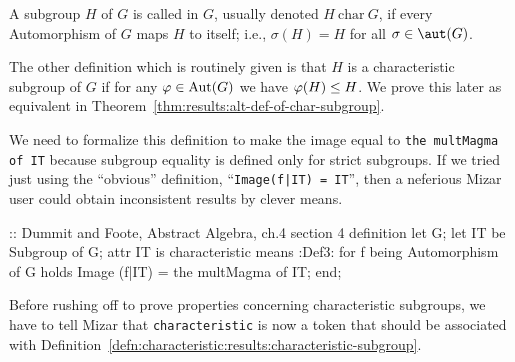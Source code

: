\begin{definition}\label{defn:characteristic:results:characteristic-subgroup}
A subgroup $H$ of $G$ is called  in $G$, usually
denoted $H~\mathrm{char}~G$, if every Automorphism of $G$ maps $H$ to
itself; i.e., $\sigma(H)=H$ for all $\sigma\in\aut(G)$.
\end{definition}

\begin{def-remark}
The other definition which is routinely given is that $H$ is a
characteristic subgroup of $G$ if for any $\varphi\in\operatorname{Aut}(G)$ we have
$\varphi(H)\leq H$. We prove this later as equivalent in Theorem~\ref{thm:results:alt-def-of-char-subgroup}.
\end{def-remark}
\begin{def-remark}
We need to formalize this definition to make the image equal to
\lstinline{the multMagma of IT} because subgroup equality is defined
only for strict subgroups. If we tried just using the ``obvious''
definition, ``\lstinline{Image(f|IT) = IT}'', then a neferious Mizar
user could obtain inconsistent results by clever means.
\end{def-remark}

\nwenddocs{}\endmoddef\nwstartdeflinemarkup{}\nwenddeflinemarkup
:: Dummit and Foote, Abstract Algebra, ch.4 section 4
definition
  let G;
  let IT be Subgroup of G;
  attr IT is characteristic means
  :Def3:
  for f being Automorphism of G
  holds Image (f|IT) = the multMagma of IT;
end;
\eatline
{}\nwendcode{}\nwdocspar
\begin{voc}
Before rushing off to prove properties concerning characteristic
subgroups, we have to tell Mizar that \lstinline|characteristic| is now
a token that should be associated with Definition~\ref{defn:characteristic:results:characteristic-subgroup}.
\end{voc}

